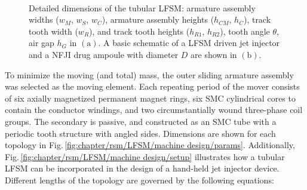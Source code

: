         
        \begin{figure}
            \centering
            \\
            \caption{ 
                \label{fig:chapter/rsm/LFSM/machine design}Detailed dimensions of the tubular LFSM: 
                armature assembly widths ($w_M$, $w_S$, $w_C$),
                armature assembly heights ($h_{CM}$, $h_{C}$),
                track tooth width ($w_{R}$),
                and track tooth heights ($h_{R1}$, $h_{R2}$), tooth angle $\theta$, air gap $h_G$ in $\mathrm{(a)}$. A basic schematic of a LFSM driven jet injector and a NFJI drug ampoule with diameter $D$ are shown in $\mathrm{(b)}$.
            }
        \end{figure}
        
        
        To minimize the moving (and total) mass, the outer sliding armature assembly was selected as the moving element. Each repeating period of the mover consists of six axially magnetized permanent magnet rings, six \acf{SMC} cylindrical cores to contain the conductor windings, and two circumstantially wound three-phase coil groups. The secondary is passive, and constructed as an SMC tube with a periodic tooth structure with angled sides. Dimensions are shown for each topology in Fig.\,\ref{fig:chapter/rsm/LFSM/machine design/params}. Additionally, Fig.\,\ref{fig:chapter/rsm/LFSM/machine design/setup} illustrates how a tubular \acs{LFSM} can be incorporated in the design of a hand-held jet injector device. Different lengths of the topology are governed by the following equations:
        
